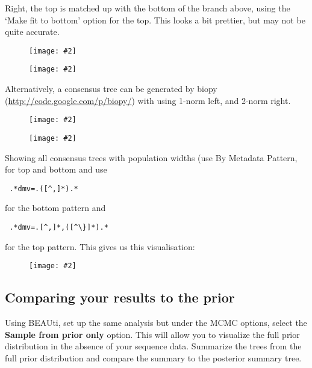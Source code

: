 \documentclass{article}
\newcommand{\includeimage}[2][]{%
\texttt{[image: \#2]}
}
\begin{document}
Right, the top is matched up with the bottom of the branch above, using the `Make fit to bottom'
option for the top. This looks a bit prettier, but may not be quite accurate.

\begin{figure}
\centering
\includeimage[scale=0.18]{figures/species_population1}
\includeimage[scale=0.18]{figures/species_population2}
\end{figure}

Alternatively, a consensus tree can be generated by biopy (\url{http://code.google.com/p/biopy/})
with using 1-norm left, and 2-norm right.

\begin{figure}
\centering
\includeimage[scale=0.18]{figures/species_population4}
\includeimage[scale=0.18]{figures/species_population5}
\end{figure}

Showing all consensus trees with population widths
(use By Metadata Pattern, for top and bottom and use {\begin{verbatim} .*dmv=.([^,]*).*\end{verbatim}} 
for the bottom pattern and {\begin{verbatim} .*dmv=.[^,]*,([^\}]*).*\end{verbatim}} for the top pattern.
This gives us this visualisation:

\begin{figure}
\centering
\includeimage[scale=0.25]{figures/species_population3}
\end{figure}


\subsection*{Comparing your results to the prior}

Using BEAUti, set up the same analysis but under the MCMC options, select the {\bf Sample from prior only} option. This will allow you to visualize the full prior distribution in the absence of your sequence data. Summarize the trees from the full prior
distribution and compare the summary to the posterior summary tree.




\end{document}
